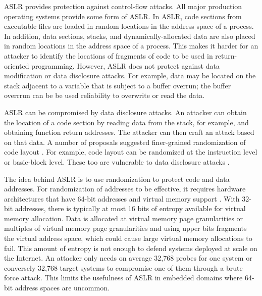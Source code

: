 ASLR \cite{PaX2003,WikipediaASLR} provides protection against 
control-flow attacks.   All major production operating systems provide
some form of ASLR. In ASLR, code
sections from executable files are loaded in random locations in the
address space of a process.  In addition, data sections, stacks, and
dynamically-allocated data are also placed in random locations in the address
space of a process. This makes it harder for an attacker to identify the locations of fragments of code to be used in return-oriented programming.  However, ASLR does
not protect against data modification or data disclosure attacks. For example, data 
may be located on the stack adjacent to a
variable that is subject to a buffer overrun; the buffer overrrun can be
be used reliability to overwrite or read the data.   

ASLR can be compromised by data disclosure attacks.  An attacker can obtain the
location of a code section by reading data from the stack, for example, and obtaining function return addresses.  The attacker can then craft an attack based on that data. 
A number of proposals suggested finer-grained  randomization of code layout
\cite{Bhatkar2005, Hiser2012, Kil2006, Pappas2012,Wartell2012}.
For example, code layout can be randomized at the instruction level or
basic-block level. These too are vulnerable to 
data disclosure attacks \cite{Snow2013}.

The idea behind ASLR is to use randomization to protect
code and data addresses.  For randomization of addresses to be effective, 
it requires hardware  architectures that have 64-bit addresses and 
virtual memory support \cite{Shacham2004}.  With 32-bit addresses, 
there is typically  at most 16 bits of entropy available for
virtual memory allocation.  Data is allocated at virtual memory
page granularities or multiples of virtual memory page granularities
and using upper bits fragments the virtual address space, which
could cause large virtual memory allocations to fail.  This
amount of entropy is not enough to defend systems deployed at scale on
the Internet.  An attacker only needs on average 32,768 probes for one system or 
conversely 32,768 target systems to compromise one of them through a
brute force attack.
This limits the usefulness of ASLR in embedded domains where 
64-bit address spaces are uncommon.  

